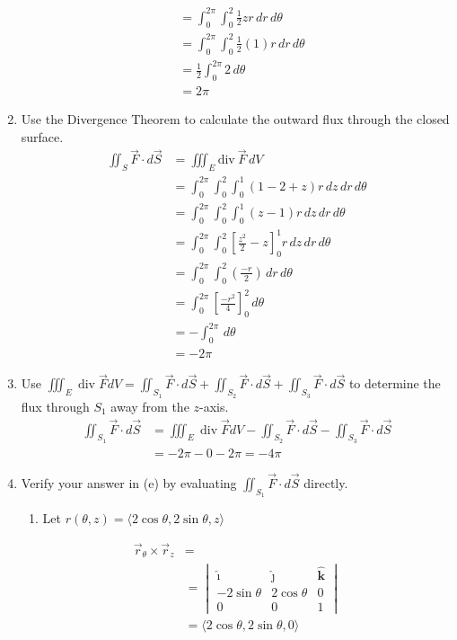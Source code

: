 \documentclass[letter,11pt]{article}
\begin{document}
\begin{enumerate}[label = \alph*.]
\begin{align*}
        &= \int_{0}^{2\pi}\int_{0}^{2} \frac{1}{2}z r\,dr\, d\theta\\
        &= \int_{0}^{2\pi}\int_{0}^{2} \frac{1}{2}\left(1\right) r\,dr\, d\theta\\
        &= \frac{1}{2}\int_{0}^{2\pi} 2\, d\theta\\
        &= \boxed{2\pi}
    \end{align*}
    \item Use the Divergence Theorem to calculate the outward flux through the closed surface.
   \begin{align*}
        \iint_{S} \vec{F} \cdot d\vec{S} &= \iiint_{E} \mathrm{div}~\vec{F} \, dV\\
        &= \int_{0}^{2\pi}\int_{0}^{2}\int_{0}^{1} \left(1-2+z\right) r\, dz\, dr\, d\theta\\
        &= \int_{0}^{2\pi}\int_{0}^{2}\int_{0}^{1}\left(z-1\right)r\, dz \, dr\, d\theta\\
        &= \int_{0}^{2\pi}\int_{0}^{2}\left[\frac{z^{2}}{2}-z\right]_{0}^{1} r\, dz \, dr\, d\theta\\
        &= \int_{0}^{2\pi}\int_{0}^{2} \left(\frac{-r}{2}\right)\, dr\, d\theta\\
        &= \int_{0}^{2\pi}\left[\frac{-r^2}{4}\right]_{0}^{2}\, d\theta\\
        &= -\int_{0}^{2\pi}\, d\theta\\
        &= \boxed{-2\pi}
    \end{align*}
    \item Use $\iiint_{E} \operatorname{div} \vec{F} d V=\iint_{S_{1}} \vec{F} \cdot d \vec{S}+\iint_{S_{2}} \vec{F} \cdot d \vec{S}+\iint_{S_{3}} \vec{F} \cdot d \vec{S}$ to determine the flux through $S_{1}$ away from the $z$-axis.
    \begin{align*}
        \iint_{S_{1}} \vec{F} \cdot d \vec{S} &= \iiint_{E} \operatorname{div} \vec{F} d V- \iint_{S_{2}} \vec{F} \cdot d \vec{S}-\iint_{S_{3}} \vec{F} \cdot d \vec{S} \\
        &= -2\pi-0-2\pi = \boxed{-4\pi}
    \end{align*}
    \item Verify your answer in (e) by evaluating $\iint_{S_{1}} \vec{F} \cdot d \vec{S}$ directly.
    \begin{enumerate}
        \item Let $r\left(\theta,z\right) = \langle 2\cos\theta,2\sin\theta,z\rangle$
    \end{enumerate}

    \begin{align*}
        \vec{r}_{\theta}\times \vec{r}_{z} &= \\
        &= \begin{vmatrix} 
        \boldsymbol{\hat\imath} & \boldsymbol{\hat\jmath} & \boldsymbol{\hat k}\\
        -2\sin\theta & 2\cos\theta & 0 \\
        0 & 0 & 1
        \end{vmatrix}\\
        &= \langle 2\cos\theta,2\sin\theta, 0\rangle
    \end{align*}


\end{enumerate}
\end{document}
